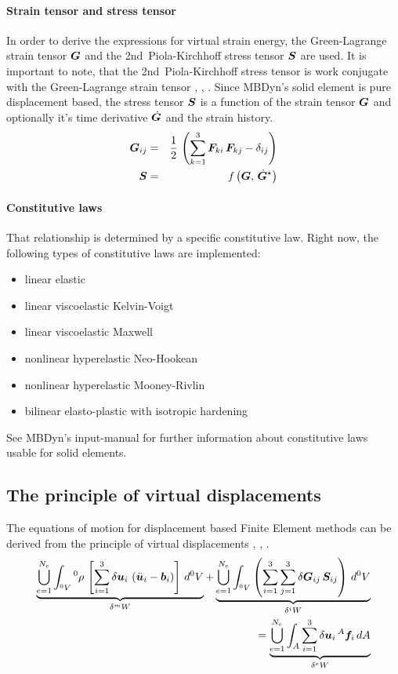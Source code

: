 \paragraph{Strain tensor and stress tensor}
In order to derive the expressions for virtual strain energy, the Green-Lagrange strain tensor $\bm{G}$ and the 2nd~Piola-Kirchhoff stress tensor $\bm{S}$ are used.
It is important to note, that the 2nd~Piola-Kirchhoff stress tensor is work conjugate with the Green-Lagrange strain tensor \cite{WALLRAPP1998}, \cite{BATHE2016}, \cite{KUEBLER2005}.
Since MBDyn's solid element is pure displacement based, the stress tensor $\bm{S}$ is a function of the strain tensor $\bm{G}$ and optionally it's time derivative $\dot{\bm{G}}$ and the strain history.
\begin{eqnarray}
\bm{G}_{ij} & = & \frac{1}{2} \, \left(\sum_{k=1}^3\bm{F}_{ki}\,\bm{F}_{kj} - \delta_{ij}\right) \label{eq:solid:G}\\
\bm{S} & = & \mathit{f}\left(\bm{G}, \, \dot{\bm{G}}^{\star}\right)
\end{eqnarray}

\paragraph{Constitutive laws}
That relationship is determined by a specific constitutive law.
Right now, the following types of constitutive laws are implemented:
\begin{itemize}
\item linear elastic
\item linear viscoelastic Kelvin-Voigt \cite{KUEBLER2005}
\item linear viscoelastic Maxwell \cite{bleyer2018numericaltours}
\item nonlinear hyperelastic Neo-Hookean \cite{KUEBLER2005}
\item nonlinear hyperelastic Mooney-Rivlin \cite{BATHE2016}
\item bilinear elasto-plastic with isotropic hardening \cite{BATHE2016}
\end{itemize}
See MBDyn's input-manual for further information about constitutive laws usable for solid elements.

\subsection{The principle of virtual displacements}
The equations of motion for displacement based Finite Element methods can be derived from the principle of virtual displacements \cite{WALLRAPP1998}, \cite{BATHE2016}, \cite{KUEBLER2005}.
\begin{eqnarray}
\underbrace{\bigcup_{e=1}^{N_e}\int_{^0V} {^0}\rho \, \left[\sum_{i=1}^3 \delta\bm{u}_i\,\left(\ddot{\bm{u}}_i - \bm{b}_i\right) \right]\, d^0V}_{\delta ^mW} + \underbrace{\bigcup_{e=1}^{N_e}\int_{^0V} \left(\sum_{i=1}^3\sum_{j=1}^3 \delta\bm{G}_{ij}\,\bm{S}_{ij} \right) \, d^0V}_{\delta^iW} \nonumber \\
= \underbrace{\bigcup_{e=1}^{N_e}\int_{A} \sum_{i=1}^3 \delta\bm{u}_i\,^A\bm{f}_i \,dA}_{\delta^eW}
\end{eqnarray}

